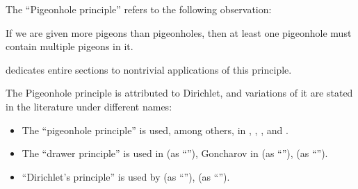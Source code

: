 \begin{concept}\label{con:pigeonhole_principle}
  The \enquote{Pigeonhole principle} refers to the following observation:
  \begin{displayquote}
    If we are given more pigeons than pigeonholes, then at least one pigeonhole must contain multiple pigeons in it.
  \end{displayquote}

  \Textcite[sec. 6.2]{Rosen2019DiscreteMathematics} dedicates entire sections to nontrivial applications of this principle.

  The Pigeonhole principle is attributed to Dirichlet, and variations of it are stated in the literature under different names:
  \begin{itemize}
    \item The \enquote{pigeonhole principle} is used, among others, in \cite[289]{Knuth1997ArtVol2}, \cite[sec. 6.2]{Rosen2019DiscreteMathematics}, \cite[exerc. A-4.1]{Rotman2015AdvancedModernAlgebraPart1}, \cite[134]{Enderton1977SetTheory} and \cite[16]{Savage2008ModelsOfComputation}.

    \item The \enquote{drawer principle} is used in \cite[222]{Арнольд2014ОДУ} (as \enquote{}), Goncharov in \cite[156]{Гончаров1952ФункцииДействительногоПеременного} (as \enquote{}), \cite[224]{Проданов1982ФункционаленАнализЧаст1} (as \enquote{}).

    \item \enquote{Dirichlet's principle} is used by \cite[64]{Гуров2013ТеорияРешёток} (as \enquote{}), \cite[9]{Мирчев2001Графи} (as \enquote{}).
  \end{itemize}
\end{concept}

